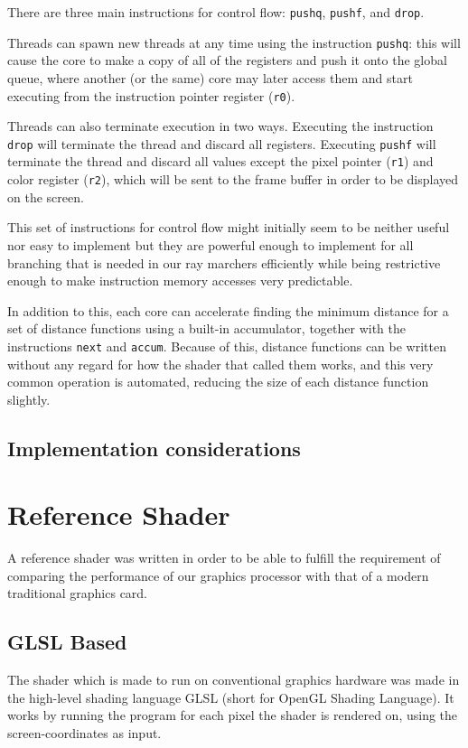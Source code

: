 			There are three main instructions for control flow: \texttt{pushq},
			\texttt{pushf}, and \texttt{drop}. 
			
			Threads can spawn new threads at any time using the instruction
			\texttt{pushq}: this will cause the core to make a copy of all of
			the registers and push it onto the global queue, where another (or
			the same) core may later access them and start executing from the
			instruction pointer register (\texttt{r0}).
			
			Threads can also terminate execution in two ways. Executing the
			instruction \texttt{drop} will terminate the thread and discard all
			registers. Executing \texttt{pushf} will terminate the thread and
			discard all values except the pixel pointer (\texttt{r1}) and color
			register (\texttt{r2}), which will be sent to the frame buffer in
			order to be displayed on the screen.
	
			This set of instructions for control flow might initially seem to
			be neither useful nor easy to implement but they are powerful
			enough to implement for all branching that is needed in our ray
			marchers efficiently while being restrictive enough to make
			instruction memory accesses very predictable.

			In addition to this, each core can accelerate finding the minimum 
			distance for a set of distance functions using a built-in 
			accumulator, together with the instructions \texttt{next} and 
			\texttt{accum}. Because of this, distance functions can be written
			without any regard for how the shader that called them works, and
			this very common operation is automated, reducing the size of each
			distance function slightly.
		
		\subsection{Implementation considerations}
	
	\section{Reference Shader} \label{implshader}
		
		A reference shader was written in order to be able to fulfill the
		requirement of comparing the performance of our graphics processor with
		that of a modern traditional graphics card. 
	
		\subsection{GLSL Based}
			The shader which is made to run on conventional graphics hardware
			was made in the high-level shading language GLSL (short for 
			OpenGL Shading Language). It works by running the program for
			each pixel the shader is rendered on, using the screen-coordinates 
			as input.

